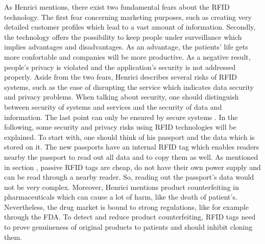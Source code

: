 As Henrici \cite{henrici} mentions, there exist two fundamental fears about the RFID technology. The first fear concerning marketing purposes, such as creating very detailed customer profiles which lead to a vast amount of information. Secondly, the technology offers the possibility to keep people under surveillance which implies advantages and disadvantages. As an advantage, the patients' life gets more confortable and companies will be more productive. As a negative result, people's privacy is violated and the application's security is not addressed properly.
Aside from the two fears, Henrici describes several risks of RFID systems, such as the ease of disrupting the service which indicates data security and privacy problems. When talking about security, one should distinguish between security of systems and services and the security of data and information. The last point can only be ensured by secure systems \cite{henrici}. 
In the following, some security and privacy risks using RFID technologies will be explained. To start with, one should think of his passport and the data which is stored on it. The new passports have an internal RFID tag which enables readers nearby the passport to read out all data and to copy them as well. As mentioned in section \pageref{tags}, passive RFID tags are cheap, do not have their own power supply and can be read through a nearby reader. So, reading out the passport's data would not be very complex.
Moreover, Henrici mentions product counterfeiting in pharmaceuticals which can cause a lot of harm, like the death of patient's. Nevertheless, the drug market is bound to strong regulations, like for example through the \ac{FDA}. To detect and reduce product counterfeiting, RFID tags need to prove genuineness of original products to patients and should inhibit cloning them.

